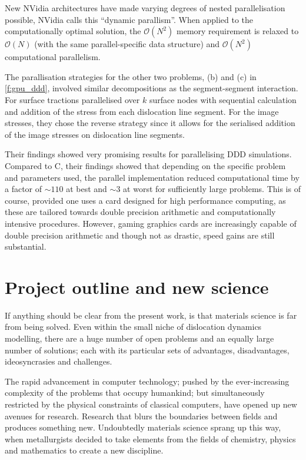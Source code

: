 New NVidia architectures have made varying degrees of nested parallelisation possible, NVidia calls this ``dynamic parallism''. When applied to the computationally optimal solution, the $ \mathcal{O}(N^{2}) $ memory requirement is relaxed to $ \mathcal{O}(N) $ (with the same parallel-specific data structure) and $ \mathcal{O}(N^{2}) $ computational parallelism.

The parallisation strategies for the other two problems, (b) and (c) in \cref{f:gpu_ddd}, involved similar decompositions as the segment-segment interaction. For surface tractions \citet{gpu_ddd} parallelised over $ k $ surface nodes with sequential calculation and addition of the stress from each dislocation line segment. For the image stresses, they chose the reverse strategy since it allows for the serialised addition of the image stresses on dislocation line segments.

Their findings showed very promising results for parallelising DDD simulations. Compared to C, their findings showed that depending on the specific problem and parameters used, the parallel implementation reduced computational time by a factor of $ \sim 110 $ at best and $ \sim 3 $ at worst for sufficiently large problems. This is of course, provided one uses a card designed for high performance computing, as these are tailored towards double precision arithmetic and computationally intensive procedures. However, gaming graphics cards are increasingly capable of double precision arithmetic and though not as drastic, speed gains are still substantial.

\section{Project outline and new science}
\label{s:objectives}

If anything should be clear from the present work, is that materials science is far from being solved. Even within the small niche of dislocation dynamics modelling, there are a huge number of open problems and an equally large number of solutions; each with its particular sets of advantages, disadvantages, ideosyncrasies and challenges.

The rapid advancement in computer technology; pushed by the ever-increasing complexity of the problems that occupy humankind; but simultaneously restricted by the physical constraints of classical computers, have opened up new avenues for research. Research that blurs the boundaries between fields and produces something new. Undoubtedly materials science sprang up this way, when metallurgists decided to take elements from the fields of chemistry, physics and mathematics to create a new discipline.

